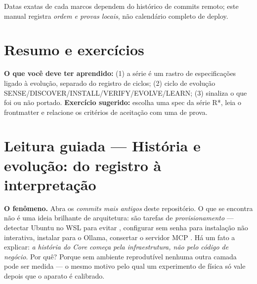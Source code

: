 \begin{aviso}
Datas exatas de cada marcos dependem do histórico de commits remoto; este manual
registra \emph{ordem e provas locais}, não calendário completo de deploy.
\end{aviso}


\section{Resumo e exercícios}

\begin{resultado}
\textbf{O que você deve ter aprendido:} (1) a série  é um
rastro de especificações ligado à evolução, separado do registro de ciclos;
(2) ciclo de evolução
SENSE/DISCOVER/INSTALL/VERIFY/EVOLVE/LEARN; (3)  sinaliza o
que foi ou não portado.
\textbf{Exercício sugerido:} escolha uma spec da série R*, leia o frontmatter e
relacione os critérios de aceitação com uma  de prova.
\end{resultado}



\section[Leitura guiada]{Leitura guiada — História e evolução: do registro à interpretação}


\begin{descricao}
\textbf{O fenômeno.} Abra os \emph{commits mais antigos} deste repositório. O que
se encontra não é uma ideia brilhante de arquitetura: são tarefas de
\emph{provisionamento} --- detectar Ubuntu no WSL para evitar
, configurar  sem senha para instalação não
interativa, instalar  para o Ollama, consertar o servidor MCP
. Há um fato a explicar: \emph{a história do Core
começa pela infraestrutura, não pelo código de negócio}. Por quê? Porque sem
ambiente reprodutível nenhuma outra camada pode ser medida --- o mesmo motivo pelo
qual um experimento de física só vale depois que o aparato é calibrado.
\end{descricao}

